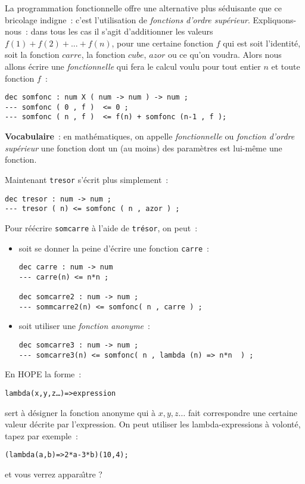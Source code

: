 La programmation fonctionnelle offre une alternative plus séduisante
que ce bricolage indigne~: c'est l'utilisation de \emph{fonctions
d'ordre supérieur}. Expliquons-nous~: dans tous les cas il s'agit
d'additionner les valeurs $f(1)+f(2)+ ... + f(n)$, pour une certaine
fonction $f$ qui est soit l'identité, soit la fonction $carre$, la
fonction $cube$, $azor$ ou ce qu'on voudra. Alors nous allons écrire
une \emph{fonctionnelle} qui fera le calcul voulu pour tout entier $n$
et toute fonction $f$~:


\begin{verbatim}
dec somfonc : num X ( num -> num ) -> num ;
--- somfonc ( 0 , f )  <= 0 ;
--- somfonc ( n , f )  <= f(n) + somfonc (n-1 , f );
\end{verbatim}

\textbf{Vocabulaire}~: en mathématiques, on appelle
\emph{fonctionnelle} ou \emph{fonction d'ordre supérieur} une fonction
dont un (au moins) des paramètres est lui-m\^eme une fonction.

Maintenant \texttt{tresor} s'écrit plus simplement~:
\begin{verbatim}
dec tresor : num -> num ;
--- tresor ( n) <= somfonc ( n , azor ) ;
\end{verbatim}

Pour réécrire \texttt{somcarre} à l'aide de \texttt{trésor}, on peut~:

\begin{itemize}
\item soit se donner la peine d'écrire une fonction \texttt{carre}~:
\begin{verbatim}
dec carre : num -> num
--- carre(n) <= n*n ;

dec somcarre2 : num -> num ;
--- sommcarre2(n) <= somfonc( n , carre ) ;
\end{verbatim}

\item soit utiliser une \emph{fonction anonyme}~:
\begin{verbatim}
dec somcarre3 : num -> num ;
--- somcarre3(n) <= somfonc( n , lambda (n) => n*n  ) ;
\end{verbatim}
\end{itemize}

En HOPE la forme~:
\begin{alltt}
lambda ( \textrm{x, y, z} \ldots ) => \textrm{expression}
\end{alltt}
sert à désigner la fonction anonyme qui à $x, y, z \ldots$ fait correspondre
une certaine valeur décrite par l'expression. On peut utiliser les
lambda-expressions à volonté, tapez par exemple~:
\begin{alltt}
	(lambda (a,b) => 2*a - 3*b) (10,4) ;
\end{alltt}
et vous verrez appara\^{\i}tre ? 


